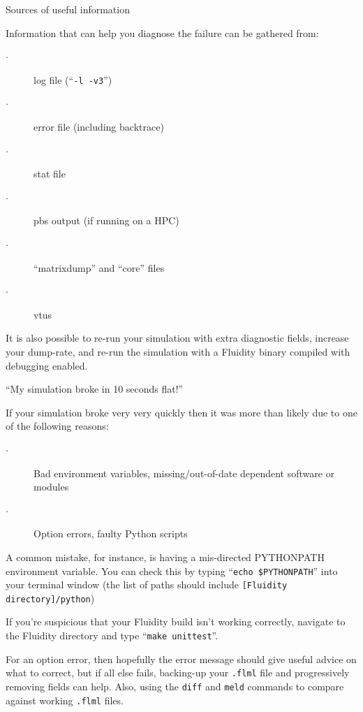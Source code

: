 \documentclass[t]{beamer}
\begin{document}

\begin{frame}{Sources of useful information}

Information that can help you diagnose the failure can be gathered from:
\vspace{1ex}

\begin{description}
 \item[$\cdot$] log file (``{\tt -l -v3}'')
 \item[$\cdot$] error file (including backtrace)
 \item[$\cdot$] stat file
 \item[$\cdot$] pbs output (if running on a HPC)
 \item[$\cdot$] ``matrixdump'' and ``core'' files
 \item[$\cdot$] vtus
\end{description}

It is also possible to re-run your simulation with extra diagnostic fields, increase your dump-rate, 
and re-run the simulation with a Fluidity binary compiled with debugging enabled.

\end{frame}


\begin{frame}{``My simulation broke in 10 seconds flat!''}

If your simulation broke very very quickly 
then it was more than likely due to one of the following reasons:
\vspace{1ex}

\begin{description}
 \item[$\cdot$] Bad environment variables, missing/out-of-date dependent software or modules
 \item[$\cdot$] Option errors, faulty Python scripts
\end{description}

A common mistake, for instance, is having a mis-directed PYTHONPATH environment variable.  
You can check this by typing ``{\tt echo \$PYTHONPATH}'' into your terminal window 
(the list of paths should include {\tt [Fluidity directory]/python})

\vspace{1ex}
If you're suspicious that your Fluidity build isn't working correctly, navigate to the Fluidity directory and type ``{\tt make unittest}''.

\vspace{1ex}
For an option error, then hopefully the error message should give useful advice on what to correct,
but if all else fails, backing-up your {\tt .flml} file and progressively removing fields can help. 
Also, using the {\tt diff} and {\tt meld} commands to compare against working {\tt .flml} files.
\end{frame}
\end{document}
